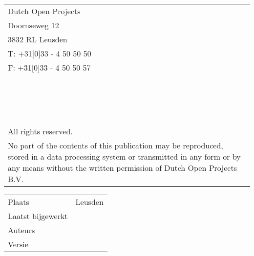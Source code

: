 
\title{\textbf{\customer} \\ \projectname}
\pretitle{\begin{flushleft}\LARGE}
\posttitle{\par\end{flushleft}}

\author{}
\date{}

\maketitle

\vspace{-2.6cm}
\begin{flushright}
\begin{tabularx}{4.8cm}{ X }
Dutch Open Projects			\\
Doornseweg 12					\\	
3832 RL Leusden					\\
T: +31[0]33 - 4 50 50 50		\\
F: +31[0]33 - 4 50 50 57		
\\*
\\*
\\*
\\*
\\*
\\*
\\*
\\*
\\*
\\*
\\*
\\*
\\*
\\*
\\*
\\*
\\*
\\*
\footnotesize
All rights reserved.\\*
\footnotesize
No part of the contents of this publication may be reproduced, stored in a data processing system or transmitted in any form or by any means without the written permission of Dutch Open Projects B.V.
\end{tabularx}
\end{flushright}
  
 \null
 \vfill    
  \begin{tabularx}{\linewidth}{ p{4cm} X }
    Plaats & Leusden								\\
    Laatst bijgewerkt & \lastupdate		\\
    Auteurs & \authors							\\
    Versie & \lastversion			\\
  \end{tabularx}
\pagebreak

